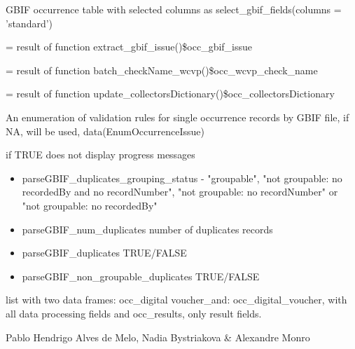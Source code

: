 \documentclass[a4paper]{book}
\begin{document}
\begin{Arguments}
\begin{ldescription}
\item[\code{occ}] GBIF occurrence table with selected columns as select\_gbif\_fields(columns = 'standard')

\item[\code{occ\_gbif\_issue}] = result of function extract\_gbif\_issue()\$occ\_gbif\_issue

\item[\code{occ\_wcvp\_check\_name}] = result of function batch\_checkName\_wcvp()\$occ\_wcvp\_check\_name

\item[\code{occ\_collectorsDictionary}] = result of function update\_collectorsDictionary()\$occ\_collectorsDictionary

\item[\code{enumOccurrenceIssue}] An enumeration of validation rules for single occurrence records by GBIF file, if NA, will be used, data(EnumOccurrenceIssue)

\item[\code{silence}] if TRUE does not display progress messages
\end{ldescription}
\end{Arguments}
%
\begin{Details}
\begin{itemize}

\item{} parseGBIF\_duplicates\_grouping\_status - "groupable", "not groupable: no recordedBy and no recordNumber",
"not groupable: no recordNumber" or "not groupable: no recordedBy"
\item{} parseGBIF\_num\_duplicates number of duplicates records
\item{} parseGBIF\_duplicates TRUE/FALSE
\item{} parseGBIF\_non\_groupable\_duplicates TRUE/FALSE

\end{itemize}

\end{Details}
%
\begin{Value}
list with two data frames: occ\_digital voucher\_and:
occ\_digital\_voucher,  with all data processing fields and
occ\_results, only result fields.
\end{Value}
%
\begin{Author}
Pablo Hendrigo Alves de Melo,
Nadia Bystriakova \&
Alexandre Monro
\end{Author}
\end{document}

